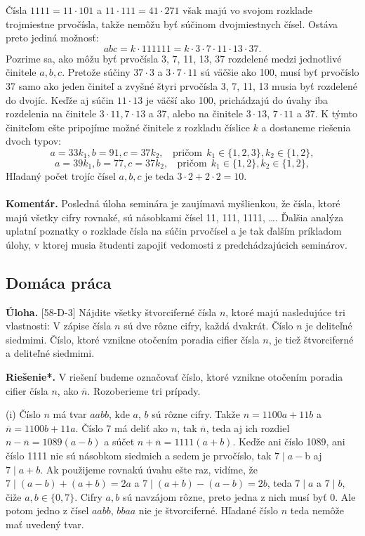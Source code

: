\documentclass[11pt,a4paper,oneside,final]{book}
\newcommand{\kom}{\textbf{Komentár.} }
\newcommand{\ul}{\textbf{Úloha.} }
\newcommand{\rieh}{\textbf{Riešenie*.} }
\begin{document}
Čísla $1 111 = 11\cdot 101$ a $11\cdot 111 = 41\cdot 271$ však majú vo svojom rozklade trojmiestne prvočísla, takže nemôžu byť súčinom dvojmiestnych čísel. Ostáva preto jediná možnosť:
$$ abc = k \cdot 111 111 = k \cdot 3 \cdot 7 \cdot 11 \cdot 13 \cdot 37.$$
Pozrime sa, ako môžu byť prvočísla 3, 7, 11, 13, 37 rozdelené medzi jednotlivé činitele $a, b, c$. Pretože súčiny $37 \cdot 3$ a $3 \cdot 7 \cdot 11$ sú väčšie ako 100, musí byť prvočíslo 37 samo ako jeden činiteľ a zvyšné štyri prvočísla 3, 7, 11, 13 musia byť rozdelené do dvojíc. Keďže aj súčin $11 \cdot 13$ je väčší ako 100, prichádzajú do úvahy iba rozdelenia na činitele $3 \cdot 11, 7 \cdot 13$ a 37, alebo na činitele $3 \cdot 13$, $7 \cdot 11$ a 37. K týmto činiteľom ešte pripojíme možné činitele z rozkladu číslice $k$ a dostaneme riešenia dvoch typov:
$$a = 33k_1, b = 91, c = 37k_2, \ \ \ \ \text {pričom} \ \ k_1 \in \{1, 2, 3\}, k_2 \in \{1, 2\},$$
$$a = 39k_1, b = 77, c = 37k_2,\ \ \ \ \text{pričom}\ \ k_1 \in \{1, 2\}, k_2 \in \{1, 2\},$$
Hľadaný počet trojíc čísel $a, b, c$ je teda $3 \cdot 2 + 2 \cdot 2 = 10$.\\
\\
\kom Posledná úloha seminára je zaujímavá myšlienkou, že čísla, ktoré majú všetky cifry rovnaké, sú násobkami čísel 11, 111, 1111, \ldots. Ďalšia analýza uplatní poznatky o rozklade čísla na súčin prvočísel a je tak ďalším príkladom úlohy, v ktorej musia študenti zapojiť vedomosti z predchádzajúcich seminárov.


\subsection*{Domáca práca}
\begin{tcolorbox}[breakable,notitle,boxrule=0pt,colback=light-gray,colframe=light-gray]\ul [58-D-3] Nájdite všetky štvorciferné čísla $n$, ktoré majú nasledujúce tri vlastnosti: V zápise čísla $n$ sú dve rôzne cifry, každá dvakrát. Číslo $n$ je deliteľné siedmimi. Číslo, ktoré vznikne otočením poradia cifier čísla $n$, je tiež štvorciferné a deliteľné siedmimi.

\end{tcolorbox}

\rieh V riešení budeme označovať číslo, ktoré vznikne otočením poradia cifier čísla $n$, ako $\overline{n}$. Rozoberieme tri prípady.

(i) Číslo $n$ má tvar $aabb$, kde $a$, $b$ sú rôzne cifry. Takže $n = 1100a + 11b$ a $\overline{n} = 1100b + 11a$. Číslo 7 má deliť ako $n$, tak $\overline{n}$, teda aj ich rozdiel $n - \overline{n} = 1089(a - b)$ a súčet $n + \overline{n} = 1111(a + b)$. Keďže ani číslo 1089, ani číslo 1111 nie sú násobkom siedmich a sedem je prvočíslo, tak $7 \mid a - $b aj $7 \mid a + b$. Ak použijeme rovnakú úvahu ešte raz, vidíme, že $7 \mid (a - b) + (a + b) = 2a$ a $7 \mid (a + b) - (a - b) = 2b$, teda $7 \mid a$ a $7 \mid b$, čiže $a, b \in \{0, 7\}$. Cifry $a, b$ sú navzájom rôzne, preto jedna z nich musí byť 0. Ale potom jedno z čísel $aabb$, $bbaa$ nie je štvorciferné. Hľadané číslo $n$ teda nemôže mať uvedený tvar.
\end{document}
